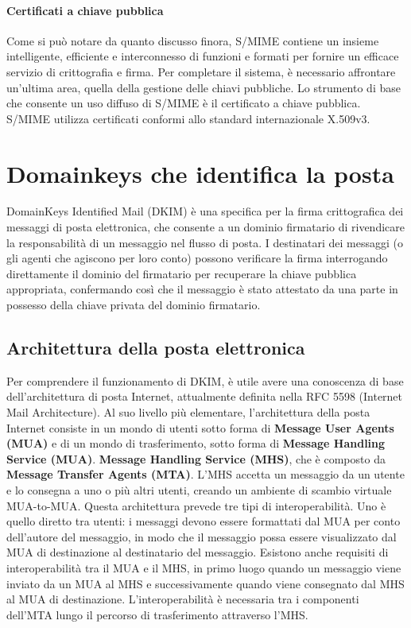 \singlespacing

\paragraph{Certificati a chiave pubblica} Come si può notare da quanto discusso finora, S/MIME contiene un insieme intelligente, efficiente e interconnesso di funzioni e formati per fornire un efficace servizio di crittografia e firma. Per completare il sistema, è necessario affrontare un'ultima area, quella della gestione delle chiavi pubbliche. Lo strumento di base che consente un uso diffuso di S/MIME è il certificato a chiave pubblica. S/MIME utilizza certificati conformi allo standard internazionale X.509v3.
\section{Domainkeys che identifica la posta}
DomainKeys Identified Mail (DKIM) è una specifica per la firma crittografica dei messaggi di posta elettronica, che consente a un dominio firmatario di rivendicare la responsabilità di un messaggio nel flusso di posta. I destinatari dei messaggi (o gli agenti che agiscono per loro conto) possono verificare la firma interrogando direttamente il dominio del firmatario per recuperare la chiave pubblica appropriata, confermando così che il messaggio è stato attestato da una parte in possesso della chiave privata del dominio firmatario. 
\subsection{Architettura della posta elettronica}
Per comprendere il funzionamento di DKIM, è utile avere una conoscenza di base dell'architettura di posta Internet, attualmente definita nella RFC 5598 (Internet Mail Architecture). Al suo livello più elementare, l'architettura della posta Internet consiste in un mondo di utenti sotto forma di \textbf{Message User Agents (MUA)} e di un mondo di trasferimento, sotto forma di \textbf{Message Handling Service (MUA)}. \textbf{Message Handling Service (MHS)}, che è composto da \textbf{Message Transfer Agents (MTA)}. L'MHS accetta un messaggio da un utente e lo consegna a uno o più altri utenti, creando un ambiente di scambio virtuale MUA-to-MUA. Questa architettura prevede tre tipi di interoperabilità. Uno è quello diretto tra utenti: i messaggi devono essere formattati dal MUA per conto dell'autore del messaggio, in modo che il messaggio possa essere visualizzato dal MUA di destinazione al destinatario del messaggio. Esistono anche requisiti di interoperabilità tra il MUA e il MHS, in primo luogo quando un messaggio viene inviato da un MUA al MHS e successivamente quando viene consegnato dal MHS al MUA di destinazione. L'interoperabilità è necessaria tra i componenti dell'MTA lungo il percorso di trasferimento attraverso l'MHS.

